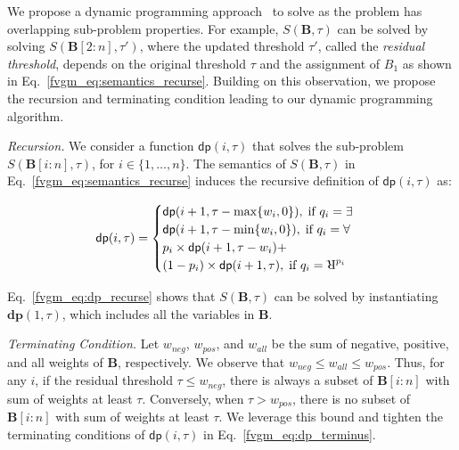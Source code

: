 We propose a dynamic programming approach~\cite{pisinger1999linear,woeginger1992equal} to solve {\stochastic} as the problem has overlapping sub-problem properties. 
For example, $S(\mathbf{B}, \tau)$ can be solved by solving $S(\mathbf{B}[2:n], \tau')$, where the updated threshold $\tau'$, called the \textit{residual threshold}, depends on the original threshold $\tau$ and the assignment of $B_1$ as shown in Eq.~\eqref{fvgm_eq:semantics_recurse}.
Building on this observation, we propose the recursion and terminating condition leading to our dynamic programming algorithm. 

\textit{Recursion.} We consider a function $ \mathsf{dp}(i, \tau) $ that solves the sub-problem $ S(\mathbf{B}[i:n],\tau)  $, for $ i \in \{1,\ldots,n\}  $. The semantics of  $ S(\mathbf{B},\tau) $ in Eq.~\eqref{fvgm_eq:semantics_recurse} induces the recursive definition of $ \mathsf{dp}(i,\tau) $ as: 

\begin{align}\label{fvgm_eq:dp_recurse}
 \mathsf{dp}(i,\tau)=
 \begin{cases}
 \mathsf{dp}(i+1, \tau-\max\{w_i, 0\}), \; \text{if } q_i = \exists\\
 \mathsf{dp}(i+1, \tau-\min\{w_i, 0\}), \; \text{if } q_i = \forall\\
 p_i \times \mathsf{dp}(i+1, \tau-w_i) + \\ (1- p_i) \times \mathsf{dp}(i+1, \tau) ,\; \text{if } q_i = \R^{p_i}
 \end{cases}
\end{align} 

Eq.~\eqref{fvgm_eq:dp_recurse} shows that $ S(\mathbf{B},\tau) $ can be solved by instantiating $ \mathbf{dp}(1, \tau) $, which includes all the variables in $ \mathbf{B} $. 

\textit{Terminating Condition.} %
Let $ w_{neg} $, $ w_{pos} $, and $ w_{all} $ be the sum of negative, positive, and all weights of $ \mathbf{B} $, respectively. We observe that $ w_{neg} \le w_{all} \le w_{pos}$. Thus, for any $ i $, if the {residual} threshold $ \tau \le w_{neg}$, there is always a subset of $ \mathbf{B}[i:n] $ with sum of weights at least $ \tau $. Conversely, when $ \tau > w_{pos}$, there is no subset of $ \mathbf{B}[i:n] $ with sum of weights at least $ \tau $.	We leverage this bound and tighten the terminating conditions of $ \mathsf{dp}(i, \tau) $ in Eq.~\eqref{fvgm_eq:dp_terminus}. 

